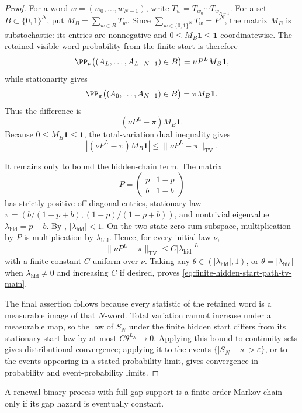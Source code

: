 \begin{proof}
For a word \(w=(w_0,\ldots,w_{N-1})\), write
\(T_w=T_{w_0}\cdots T_{w_{N-1}}\).  For a set
\(B\subset\{0,1\}^N\), put \(M_B=\sum_{w\in B}T_w\).  Since
\(\sum_{w\in\{0,1\}^N}T_w=P^N\), the matrix \(M_B\) is substochastic: its
entries are nonnegative and \(0\le M_B\mathbf1\le\mathbf1\) coordinatewise.
The retained visible word probability from the finite start is therefore
\[
\PP_\nu\bigl((A_L,\ldots,A_{L+N-1})\in B\bigr)
=\nu P^L M_B\mathbf1,
\]
while stationarity gives
\[
\PP_\pi\bigl((A_0,\ldots,A_{N-1})\in B\bigr)
=\pi M_B\mathbf1 .
\]
Thus the difference is
\[
(\nu P^L-\pi)M_B\mathbf1 .
\]
Because \(0\le M_B\mathbf1\le\mathbf1\), the total-variation dual inequality
gives
\[
\left|(\nu P^L-\pi)M_B\mathbf1\right|
\le \|\nu P^L-\pi\|_{\mathrm{TV}} .
\]

It remains only to bound the hidden-chain term.  The matrix
\[
P=\begin{pmatrix}p&1-p\\ b&1-b\end{pmatrix}
\]
has strictly positive off-diagonal entries, stationary law
\(\pi=(b/(1-p+b),(1-p)/(1-p+b))\), and nontrivial eigenvalue
\(\lambda_{\mathrm{hid}}=p-b\).  By
, \(|\lambda_{\mathrm{hid}}|<1\).
On the two-state zero-sum subspace, multiplication by \(P\) is multiplication
by \(\lambda_{\mathrm{hid}}\).  Hence, for every initial law \(\nu\),
\[
\|\nu P^L-\pi\|_{\mathrm{TV}}
\le C|\lambda_{\mathrm{hid}}|^L
\]
with a finite constant \(C\) uniform over \(\nu\).  Taking any
\(\theta\in(|\lambda_{\mathrm{hid}}|,1)\), or \(\theta=|\lambda_{\mathrm{hid}}|\)
when \(\lambda_{\mathrm{hid}}\ne0\) and increasing \(C\) if desired, proves
\eqref{eq:finite-hidden-start-path-tv-main}.

The final assertion follows because every statistic of the retained word is a
measurable image of that \(N\)-word.  Total variation cannot increase under a
measurable map, so the law of \(S_N\) under the finite hidden start differs
from its stationary-start law by at most \(C\theta^{L_N}\to0\).  Applying this
bound to continuity sets gives distributional convergence; applying it to the
events \(\{|S_N-s|>\varepsilon\}\), or to the events appearing in a stated
probability limit, gives convergence in probability and event-probability
limits.
\end{proof}

\begin{lemma}\label{lem:hazard-obstruction-main}
A renewal binary process with full gap support is a finite-order Markov chain
only if its gap hazard is eventually constant.
\end{lemma}


